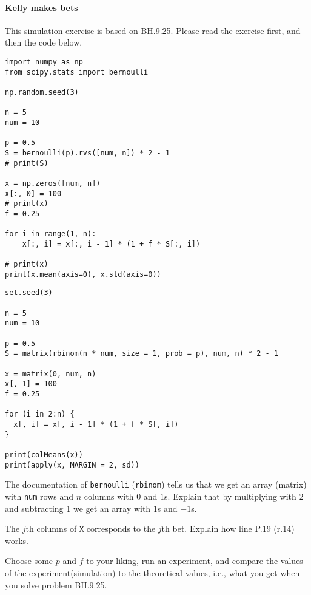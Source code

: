 \documentclass[assignments]{subfiles}
\begin{document}
\paragraph{Kelly makes bets}

This simulation exercise is based on BH.9.25.  Please read the exercise first, and then the code below.



\begin{verbatim}
import numpy as np
from scipy.stats import bernoulli

np.random.seed(3)

n = 5
num = 10

p = 0.5
S = bernoulli(p).rvs([num, n]) * 2 - 1
# print(S)

x = np.zeros([num, n])
x[:, 0] = 100
# print(x)
f = 0.25

for i in range(1, n):
    x[:, i] = x[:, i - 1] * (1 + f * S[:, i])

# print(x)
print(x.mean(axis=0), x.std(axis=0))
\end{verbatim}

\begin{verbatim}
set.seed(3)

n = 5
num = 10

p = 0.5
S = matrix(rbinom(n * num, size = 1, prob = p), num, n) * 2 - 1

x = matrix(0, num, n)
x[, 1] = 100
f = 0.25

for (i in 2:n) {
  x[, i] = x[, i - 1] * (1 + f * S[, i])
}

print(colMeans(x))
print(apply(x, MARGIN = 2, sd))
\end{verbatim}



\begin{exercise}
The documentation of \texttt{bernoulli} (\texttt{rbinom}) tells us that we get an array (matrix) with \texttt{num} rows and $n$ columns with $0$ and $1$s. Explain that by multiplying with 2 and subtracting 1 we get an array with $1$s and $-1$s.
\end{exercise}

\begin{exercise}
The $j$th columns of \texttt{X} corresponds to the $j$th bet. Explain how line P.19 (r.14) works.
\end{exercise}

\begin{exercise}
Choose some $p$ and $f$ to your liking, run an experiment, and compare the values of the experiment(simulation) to the theoretical values, i.e., what you get when you solve  problem BH.9.25.
\end{exercise}
\end{document}
